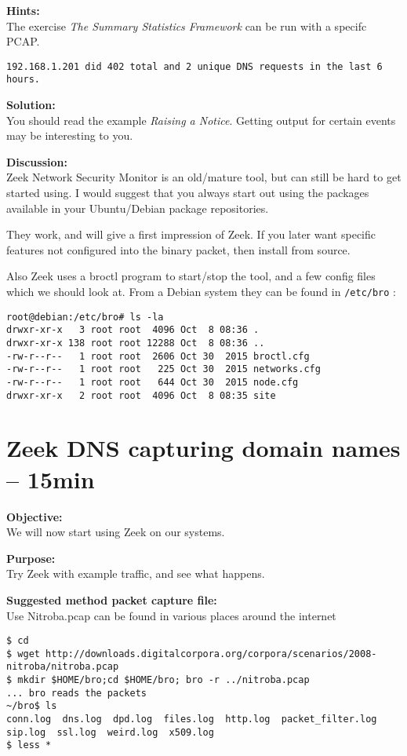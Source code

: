 \documentclass[a4paper,11pt,notitlepage]{report}
\begin{document}
{\bf Hints:}\\
The exercise
\emph{The Summary Statistics Framework} can be run with a specifc PCAP.

\verb+192.168.1.201 did 402 total and 2 unique DNS requests in the last 6 hours.+

{\bf Solution:}\\
You should read the example \emph{Raising a Notice}. Getting output for certain events may be interesting to you.


{\bf Discussion:}\\
Zeek Network Security Monitor is an old/mature tool, but can still be hard to get started using. I would suggest that you always start out using the packages available in your Ubuntu/Debian package repositories.

They work, and will give a first impression of Zeek. If you later want specific features not configured into the binary packet, then install from source.

Also Zeek uses a broctl program to start/stop the tool, and a few config files which we should look at. From a Debian system they can be found in \verb+/etc/bro+ :

\begin{verbatim}
root@debian:/etc/bro# ls -la
drwxr-xr-x   3 root root  4096 Oct  8 08:36 .
drwxr-xr-x 138 root root 12288 Oct  8 08:36 ..
-rw-r--r--   1 root root  2606 Oct 30  2015 broctl.cfg
-rw-r--r--   1 root root   225 Oct 30  2015 networks.cfg
-rw-r--r--   1 root root   644 Oct 30  2015 node.cfg
drwxr-xr-x   2 root root  4096 Oct  8 08:35 site
\end{verbatim}

\chapter{Zeek DNS capturing domain names -- 15min}
\label{ex:zeekdnsbasic}


{\bf Objective:} \\
We will now start using Zeek on our systems.


{\bf Purpose:}\\
Try Zeek with example traffic, and see what happens.


{\bf Suggested method packet capture file:}\\
Use Nitroba.pcap can be found in various places around the internet

\begin{verbatim}
$ cd
$ wget http://downloads.digitalcorpora.org/corpora/scenarios/2008-nitroba/nitroba.pcap
$ mkdir $HOME/bro;cd $HOME/bro; bro -r ../nitroba.pcap
... bro reads the packets
~/bro$ ls
conn.log  dns.log  dpd.log  files.log  http.log  packet_filter.log
sip.log  ssl.log  weird.log  x509.log
$ less *
\end{verbatim}
\end{document}

